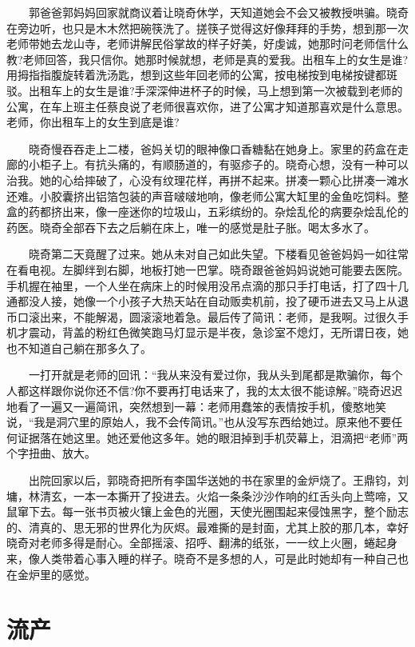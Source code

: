 \documentclass[12pt,UTF8]{ctexbook}
\begin{document}
　　郭爸爸郭妈妈回家就商议着让晓奇休学，天知道她会不会又被教授哄骗。晓奇在旁边听，也只是木木然把碗筷洗了。搓筷子觉得这好像拜拜的手势，想到那一次老师带她去龙山寺，老师讲解民俗掌故的样子好美，好虔诚，她那时问老师信什么教?老师回答，我只信你。她那时候就想，老师是真的爱我。出租车上的女生是谁?用拇指指腹旋转着洗汤匙，想到这些年回老师的公寓，按电梯按到电梯按键都斑驳。出租车上的女生是谁?手深深伸进杯子的时候，马上想到第一次被载到老师的公寓，在车上班主任蔡良说了老师很喜欢你，进了公寓才知道那喜欢是什么意思。老师，你出租车上的女生到底是谁?

　　晓奇慢吞吞走上二楼，爸妈关切的眼神像口香糖黏在她身上。家里的药盒在走廊的小柜子上。有抗头痛的，有顺肠道的，有驱疹子的。晓奇心想，没有一种可以治我。她的心给摔破了，心没有纹理花样，再拼不起来。拼凑一颗心比拼凑一滩水还难。小胶囊挤出铝箔包装的声音啵啵地响，像老师公寓大缸里的金鱼吃饲料。整盒的药都挤出来，像一座迷你的垃圾山，五彩缤纷的。杂烩乱伦的病要杂烩乱伦的药医。晓奇全部吞下去之后躺在床上，唯一的感觉是肚子胀。喝太多水了。

　　晓奇第二天竟醒了过来。她从未对自己如此失望。下楼看见爸爸妈妈一如往常在看电视。左脚绊到右脚，地板打她一巴掌。晓奇跟爸爸妈妈说她可能要去医院。手机握在袖里，一个人坐在病床上的时候用没吊点滴的那只手打电话，打了四十几通都没人接，她像一个小孩子大热天站在自动贩卖机前，投了硬币进去又马上从退币口滚出来，不能解渴，圆滚滚地着急。最后传了简讯：老师，是我啊。过很久手机才震动，背盖的粉红色微笑跑马灯显示是半夜，急诊室不熄灯，无所谓日夜，她也不知道自己躺在那多久了。

　　一打开就是老师的回讯：\enquote{我从来没有爱过你，我从头到尾都是欺骗你，每个人都这样跟你说你还不信?你不要再打电话来了，我的太太很不能谅解。}晓奇迟迟地看了一遍又一遍简讯，突然想到一幕：老师用蠢笨的表情按手机，傻憨地笑说，\enquote{我是洞穴里的原始人，我不会传简讯。}也从没写东西给她过。原来他不要任何证据落在她这里。她还爱他这多年。她的眼泪掉到手机荧幕上，泪滴把\enquote{老师}两个字扭曲、放大。

　　出院回家以后，郭晓奇把所有李国华送她的书在家里的金炉烧了。王鼎钧，刘墉，林清玄，一本一本撕开了投进去。火焰一条条沙沙作响的红舌头向上莺啼，又鼠窜下去。每一张书页被火镶上金色的光圈，天使光圈围起来侵蚀黑字，整个励志的、清真的、思无邪的世界化为灰烬。最难撕的是封面，尤其上胶的那几本，幸好晓奇对老师多得是耐心。全部摇滚、招呼、翻沸的纸张，一一纹上火圈，蜷起身来，像人类带着心事入睡的样子。晓奇不是多想的人，可是此时她却有一种自己也在金炉里的感觉。

\hypertarget{ux6d41ux4ea7}{%
\section*{流产}\label{ux6d41ux4ea7}}
\end{document}
